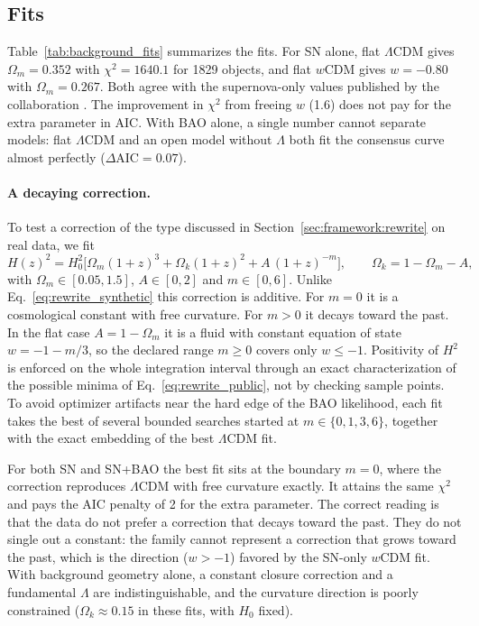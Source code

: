 \documentclass[11pt]{article}
\theoremstyle{plain}
\theoremstyle{definition}
\theoremstyle{remark}
\begin{document}
\subsection{Fits}\label{sec:background:fits}

Table~\ref{tab:background_fits} summarizes the fits. For SN alone, flat $\Lambda$CDM gives $\Omega_m=0.352$ with $\chi^2=1640.1$ for 1829 objects, and flat $w$CDM gives $w=-0.80$ with $\Omega_m=0.267$. Both agree with the supernova-only values published by the collaboration \cite{DES2024SN5YRCosmology}. The improvement in $\chi^2$ from freeing $w$ (1.6) does not pay for the extra parameter in AIC. With BAO alone, a single number cannot separate models: flat $\Lambda$CDM and an open model without $\Lambda$ both fit the consensus curve almost perfectly ($\Delta\mathrm{AIC}=0.07$).



\paragraph{A decaying correction.}
To test a correction of the type discussed in Section~\ref{sec:framework:rewrite} on real data, we fit
\begin{equation}
H(z)^2=H_0^2\big[\Omega_m(1+z)^3+\Omega_k(1+z)^2+A\,(1+z)^{-m}\big],\qquad \Omega_k=1-\Omega_m-A,
\label{eq:rewrite_public}
\end{equation}
with $\Omega_m\in[0.05,1.5]$, $A\in[0,2]$ and $m\in[0,6]$. Unlike Eq.~\eqref{eq:rewrite_synthetic} this correction is additive. For $m=0$ it is a cosmological constant with free curvature. For $m>0$ it decays toward the past. In the flat case $A=1-\Omega_m$ it is a fluid with constant equation of state $w=-1-m/3$, so the declared range $m\ge0$ covers only $w\le-1$. Positivity of $H^2$ is enforced on the whole integration interval through an exact characterization of the possible minima of Eq.~\eqref{eq:rewrite_public}, not by checking sample points. To avoid optimizer artifacts near the hard edge of the BAO likelihood, each fit takes the best of several bounded searches started at $m\in\{0,1,3,6\}$, together with the exact embedding of the best $\Lambda$CDM fit.

For both SN and SN+BAO the best fit sits at the boundary $m=0$, where the correction reproduces $\Lambda$CDM with free curvature exactly. It attains the same $\chi^2$ and pays the AIC penalty of 2 for the extra parameter. The correct reading is that the data do not prefer a correction that decays toward the past. They do not single out a constant: the family cannot represent a correction that grows toward the past, which is the direction ($w>-1$) favored by the SN-only $w$CDM fit. With background geometry alone, a constant closure correction and a fundamental $\Lambda$ are indistinguishable, and the curvature direction is poorly constrained ($\Omega_k\approx0.15$ in these fits, with $H_0$ fixed).
\end{document}
